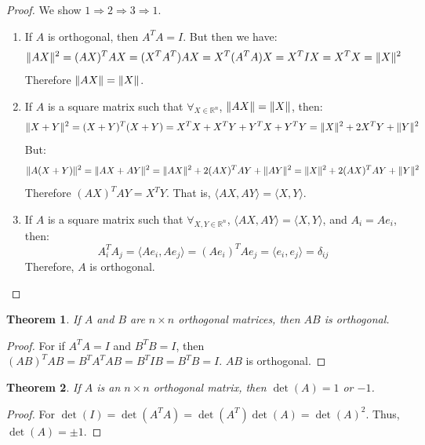 \documentclass[oneside]{book}
\theoremstyle{mystyle}
\newtheorem{theorem}{Theorem}[section]
\DeclarePairedDelimiter\norm{\lVert}{\rVert}
\begin{document}
\begin{proof}
We show $1\Rightarrow 2 \Rightarrow 3 \Rightarrow 1$.
\begin{enumerate}[itemsep=0pt]
\item If $A$ is orthogonal, then $A^TA = I$. But then we have:
    \begin{equation*}
        \norm{AX}^{2}=(AX)^{T}AX=(X^{T}A^{T})AX=X^{T}(A^{T}A)X=X^{T}IX=X^{T}X=\norm{X}^{2}
    \end{equation*}
    Therefore $\norm{AX} = \norm{X}$.
\item If $A$ is a square matrix such that $\forall_{X\in\mathbb{R}^{n}}$, $\norm{AX} = \norm{X}$, then:
    \begin{equation*}
        \norm{X+Y}^{2}=(X+Y)^T(X+Y)=X^TX+X^TY+Y^TX+Y^TY=\norm{X}^2+2X^TY+\norm{Y}^2
    \end{equation*}
    But:
    \begin{equation*}
        \norm{A(X+Y)}^{2}=\norm{AX+AY}^{2}=\norm{AX}^{2}+2(AX)^{T}AY+\norm{AY}^2=\norm{X}^{2}+2(AX)^{T}AY+\norm{Y}^2
    \end{equation*}
    Therefore $(AX)^TAY = X^TY$. That is, $\langle AX, AY\rangle = \langle X, Y\rangle$.
    \item If $A$ is a square matrix such that $\forall_{X,Y\in \mathbb{R}^n}$, $\langle AX, AY\rangle = \langle X, Y\rangle$, and $A_i =  Ae_i$, then:
        \begin{equation*}
            A_{i}^{T}A_{j}=\langle Ae_{i}, Ae_{j}\rangle=(Ae_{i})^{T}Ae_{j}=\langle e_i,e_j\rangle=\delta_{ij}
        \end{equation*}
        Therefore, $A$ is orthogonal.
\end{enumerate}
\end{proof}
\begin{theorem}
If $A$ and $B$ are $n\times n$ orthogonal matrices, then $AB$ is orthogonal.
\end{theorem}
\begin{proof}
For if $A^{T}A = I$ and $B^{T}B = I$, then $(AB)^{T}AB = B^{T}A^{T}AB = B^{T}IB = B^{T}B = I$. $AB$ is orthogonal.
\end{proof}
\begin{theorem}
\label{theorem:LINEAR_ALGEBRA_orthogonal_matrices_have_determinant_pm_1}
If $A$ is an $n\times n$ orthogonal matrix, then $\det(A) = 1$ or $-1$.
\end{theorem}
\begin{proof}
For $\det(I) = \det(A^TA) = \det(A^T)\det(A) = \det(A)^2$. Thus, $\det(A) = \pm 1$.
\end{proof}
\end{document}
